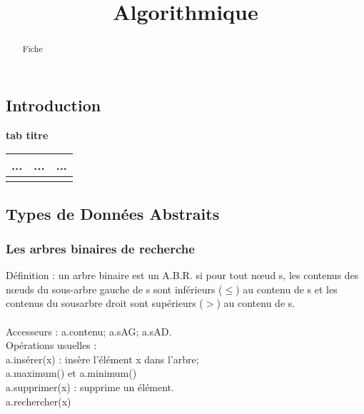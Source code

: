\documentclass[5pt]{article}
\begin{document}
\begin{scriptsize}
\title{Algorithmique}
\date{}
\begin{abstract}
Fiche
\end{abstract}
\subsection{Introduction}
\textbf{tab titre}  \\
\noindent
\begin{tabularx}{\linewidth}{|Y|Y|Y|}
\hline
... & ... & ...\\ \hline
\\ \hline
\end{tabularx} 
\subsection{Types de Données Abstraits}
\subsubsection{Les arbres binaires de recherche}
Définition : un arbre binaire est un A.B.R. si pour tout nœud s, les contenus des nœuds du sous-arbre gauche de s sont inférieurs ($\leq$) au contenu de s et les contenus du sousarbre droit sont supérieurs ($>$) au contenu de s.\\
\\
Accesseurs : a.contenu;  a.sAG;  a.sAD.\\
Opérations usuelles :\\
a.insérer(x) : insère l’élément x dans l’arbre;\\
a.maximum() et  a.minimum()\\
a.supprimer(x) : supprime un élément.\\
a.rechercher(x)

\end{scriptsize}
\end{document}
